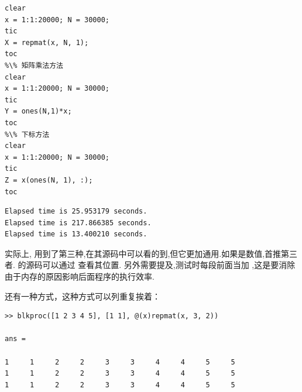 \vspace{-0.8cm}
\begin{lstlisting}[caption = 用向量重复构造矩阵]
%\% repmat 函数方法
clear
x = 1:1:20000; N = 30000;
tic
X = repmat(x, N, 1);
toc
%\% 矩阵乘法方法
clear
x = 1:1:20000; N = 30000;
tic
Y = ones(N,1)*x;
toc
%\% 下标方法
clear
x = 1:1:20000; N = 30000;
tic
Z = x(ones(N, 1), :);
toc
\end{lstlisting}

\vspace{-0.8cm}
\begin{lstlisting}
Elapsed time is 25.953179 seconds.
Elapsed time is 217.866385 seconds.
Elapsed time is 13.400210 seconds.
\end{lstlisting}

实际上,  用到了第三种,在其源码中可以看的到,但它更加通用.如果是数值,首推第三者.
  的源码可以通过  查看其位置. 另外需要提及,测试时每段前面当加 ,这是要消除由于内存的原因影响后面程序的执行效率.\par

还有一种方式，这种方式可以列重复挨着：

\vspace{-0.4cm}
\begin{lstlisting}
>> blkproc([1 2 3 4 5], [1 1], @(x)repmat(x, 3, 2))

ans =

1     1     2     2     3     3     4     4     5     5
1     1     2     2     3     3     4     4     5     5
1     1     2     2     3     3     4     4     5     5 
\end{lstlisting}

